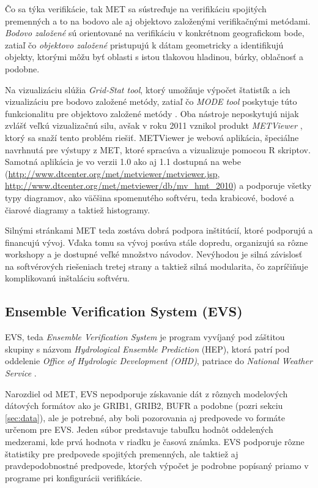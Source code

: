 Čo sa týka verifikácie, tak MET sa sústreďuje na verifikáciu spojitých premenných a to na bodovo ale aj objektovo založenými verifikačnými metódami. \textit{Bodovo založené} sú orientované na verifikáciu v konkrétnom geografickom bode, zatiaľ čo \textit{objektovo založené} pristupujú k dátam geometricky a identifikujú objekty, ktorými môžu byť oblasti s istou tlakovou hladinou, búrky, oblačnosť a podobne.

Na vizualizáciu slúžia \textit{Grid-Stat tool}, ktorý umožňuje výpočet štatistík a ich vizualizáciu pre bodovo založené metódy, zatiaľ čo \textit{MODE tool} poskytuje túto funkcionalitu pre objektovo založené metódy \cite{METuserguide}. Oba nástroje neposkytujú nijak zvlášť veľkú vizualizačnú silu, avšak v roku 2011 vznikol produkt \textit{METViewer} \cite{METviewer}, ktorý sa snaží tento problém riešiť. METViewer je webová aplikácia, špeciálne navrhnutá pre výstupy z MET, ktoré spracúva a vizualizuje pomocou R skriptov.  Samotná aplikácia je vo verzii 1.0 ako aj 1.1 dostupná na webe (\url{http://www.dtcenter.org/met/metviewer/metviewer.jsp},  \url{http://www.dtcenter.org/met/metviewer/db/mv_hmt_2010}) a podporuje všetky typy diagramov, ako väčšina spomenutého softvéru, teda krabicové, bodové a čiarové diagramy a taktiež histogramy.

Silnými stránkami MET teda zostáva dobrá podpora inštitúcií, ktoré podporujú a financujú vývoj. Vďaka tomu sa vývoj posúva stále dopredu, organizujú sa rôzne workshopy a je dostupné veľké množstvo návodov. Nevýhodou je silná závislosť na softvérových riešeniach tretej strany a taktiež silná modularita, čo zapríčiňuje komplikovanú inštaláciu softvéru.

\subsection[EVS]{Ensemble Verification System (EVS)}
EVS, teda \textit{Ensemble Verification System} \cite{EVS} je program vyvíjaný pod záštitou skupiny s názvom \textit{Hydrological Ensemble Prediction} (HEP), ktorá patrí pod oddelenie \textit{Office of Hydrologic Development (OHD)}, patriace do \textit{National Weather Service} \cite{EVSmanual}.

Narozdiel od MET, EVS nepodporuje získavanie dát z rôznych modelových dátových formátov ako je GRIB1, GRIB2, BUFR a podobne (pozri sekciu \ref{sec:data}), ale je potrebné, aby boli pozorovania aj predpovede vo formáte určenom pre EVS. Jeden súbor predstavuje tabuľku hodnôt oddelených medzerami, kde prvá hodnota v riadku je časová známka. EVS podporuje rôzne štatistiky pre predpovede spojitých premenných, ale taktiež aj pravdepodobnostné predpovede, ktorých výpočet je podrobne popísaný priamo v programe pri konfigurácii verifikácie.

